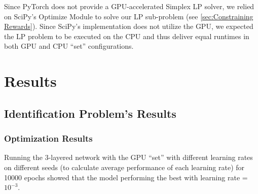 \documentclass[12pt]{article}
\begin{document}
    Since PyTorch does not provide a GPU-accelerated Simplex LP solver, we relied on SciPy's Optimize Module to solve our LP sub-problem (see \cref{sec:Constraining Rewards}). Since SciPy's implementation does not utilize the GPU, we expected the LP problem to be executed on the CPU and thus deliver equal runtimes in both GPU and CPU ``set'' configurations.
    
    \section{Results} \label{sec:Results}
    \subsection{Identification Problem's Results} \label{sec:Identification Problem's Results}
    \subsubsection{Optimization Results} \label{sec:IdProbRes - Optimization}
    Running the 3-layered network with the GPU ``set'' with different learning rates on different seeds (to calculate average performance of each learning rate) for 10000 epochs showed that the model performing the best with learning rate = $10^{-3}$. 
    
\end{document}
